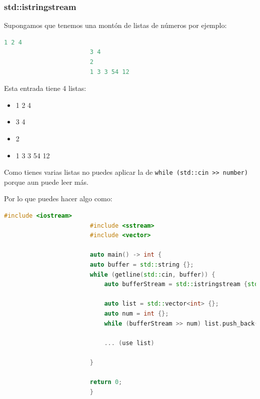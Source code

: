 \documentclass[12pt, fleqn]{report}                             %
\theoremstyle{break}                                            %
\newcommand{\textCode}[1]  { \texttt{#1} }                      %
\begin{document}
                \subsubsection{std::istringstream}
                    
                    Supongamos que tenemos una montón de listas de números
                    por ejemplo:
                    \begin{lstlisting}[language=C++, gobble=24]
                        1 2 4
                        3 4
                        2
                        1 3 3 54 12
                    \end{lstlisting}

                    Esta entrada tiene 4 listas:
                    \begin{itemize}
                        \item 1 2 4
                        \item 3 4
                        \item 2
                        \item 1 3 3 54 12
                    \end{itemize}

                    Como tienes varias listas no puedes aplicar la de
                    \textCode{while (std::cin >\/> \; number) } porque aun puede leer más.

                    Por lo que puedes hacer algo como:
                    \begin{lstlisting}[language=C++, gobble=24]
                        #include <iostream>
                        #include <sstream>
                        #include <vector>

                        auto main() -> int {
                        auto buffer = std::string {};
                        while (getline(std::cin, buffer)) {
                            auto bufferStream = std::istringstream {std::move(buffer)};
                            
                            auto list = std::vector<int> {};
                            auto num = int {};
                            while (bufferStream >> num) list.push_back(num);

                            ... (use list)

                        }
                        
                        return 0;
                        }
                    \end{lstlisting}
\end{document}
